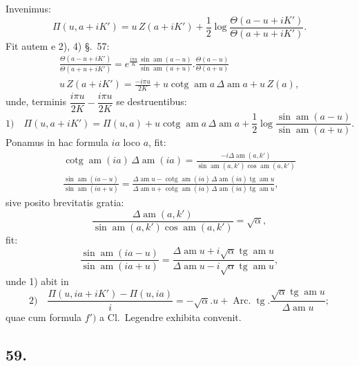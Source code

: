 \documentclass{article}
\begin{document}
Invenimus:
\[
\Pi(u,a+iK')=u\,Z(a+iK')+\frac{1}{2}\log\frac{\Theta(a-u+iK')}{\Theta(a+u+iK')}.
\]
Fit autem e 2), 4) §.\ 57:
\[
\begin{gathered}
\frac{\Theta(a-u+iK')}{\Theta(a+u+iK')}=e^{\frac{i\pi u}{K}}\frac{\sin\operatorname{am}(a-u)}{\sin\operatorname{am}(a+u)}.\frac{\Theta(a-u)}{\Theta(a+u)}\\[1.5ex]
u\,Z(a+iK')=\frac{-i\pi u}{2K}+u\operatorname{cotg}\operatorname{am}a\,\Delta\operatorname{am}a+u\,Z(a),
\end{gathered}
\]
unde, terminis $\dfrac{i\pi u}{2K}-\dfrac{i\pi u}{2K}$ se destruentibus:
\[
\text{1)}\quad \Pi(u,a+iK')=\Pi(u,a)+u\operatorname{cotg}\operatorname{am}a\,\Delta\operatorname{am}a+\frac{1}{2}\log\frac{\sin\operatorname{am}(a-u)}{\sin\operatorname{am}(a+u)}.
\]
Ponamus in hac formula $ia$ loco $a$, fit:
\[
\begin{gathered}
\operatorname{cotg}\operatorname{am}(ia)\,\Delta\operatorname{am}(ia)=\frac{-i\Delta\operatorname{am}(a,k')}{\sin\operatorname{am}(a,k')\cos\operatorname{am}(a,k')}\\[1.5ex]
\frac{\sin\operatorname{am}(ia-u)}{\sin\operatorname{am}(ia+u)}=\frac{\Delta\operatorname{am}u-\operatorname{cotg}\operatorname{am}(ia)\,\Delta\operatorname{am}(ia)\operatorname{tg}\operatorname{am}u}{\Delta\operatorname{am}u+\operatorname{cotg}\operatorname{am}(ia)\,\Delta\operatorname{am}(ia)\operatorname{tg}\operatorname{am}u},
\end{gathered}
\]
sive posito brevitatis gratia:
\[
\frac{\Delta\operatorname{am}(a,k')}{\sin\operatorname{am}(a,k')\cos\operatorname{am}(a,k')}=\sqrt{\alpha},
\]
fit:
\[
\frac{\sin\operatorname{am}(ia-u)}{\sin\operatorname{am}(ia+u)}=\frac{\Delta\operatorname{am}u+i\sqrt{\alpha}\operatorname{tg}\operatorname{am}u}{\Delta\operatorname{am}u-i\sqrt{\alpha}\operatorname{tg}\operatorname{am}u},
\]
unde 1) abit in
\[
\text{2)}\quad \frac{\Pi(u,ia+iK')-\Pi(u,ia)}{i}=-\sqrt{\alpha}.u+\operatorname{Arc.}\operatorname{tg}.\frac{\sqrt{\alpha}\operatorname{tg}\operatorname{am}u}{\Delta\operatorname{am}u};
\]
quae cum formula $f')$ a Cl.\ Legendre exhibita convenit.

\subsection*{59.}
\end{document}
